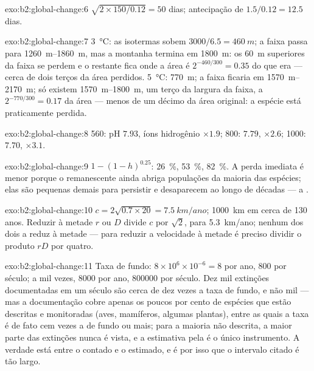 \begin{solution}{exo:b2:global-change:6}
$\sqrt{2\times 150/0.12} = 50$ dias; antecipação de $1.5/0.12 = 12.5$
dias.
\end{solution}

\begin{solution}{exo:b2:global-change:7}
\qty{3}{\celsius}: as isotermas sobem $3000/6.5 = \qty{460}{m}$; a
faixa passa para \qtyrange{1260}{1860}{m}, mas a montanha termina em
\qty{1800}{m}: os \qty{60}{m} superiores da faixa se perdem e o restante
fica onde a área é $2^{-460/300} = 0.35$ do que era --- cerca de
dois terços da área perdidos. \qty{5}{\celsius}: \qty{770}{m}; a
faixa ficaria em \qtyrange{1570}{2170}{m}; só existem \qtyrange{1570}{1800}{m},
um terço da largura da faixa, a $2^{-770/300} = 0.17$ da
área --- menos de um décimo da área original: a espécie está
praticamente perdida.
\end{solution}

\begin{solution}{exo:b2:global-change:8}
560: pH $7.93$, íons hidrogênio $\times 1.9$; 800: $7.79$, $\times
2.6$; 1000: $7.70$, $\times 3.1$.
\end{solution}

\begin{solution}{exo:b2:global-change:9}
$1 - (1 - h)^{0.25}$: \qty{26}{\%}, \qty{53}{\%}, \qty{82}{\%}. A
perda imediata é menor porque o remanescente ainda abriga populações da
maioria das espécies; elas são pequenas demais para persistir e
desaparecem ao longo de décadas --- a .
\end{solution}

\begin{solution}{exo:b2:global-change:10}
$c = 2\sqrt{0.7\times 20} = \qty{7.5}{km/ano}$; \qty{1000}{km} em
cerca de 130 anos. Reduzir à metade $r$ ou $D$ divide $c$ por
$\sqrt 2$, para \qty{5.3}{km/ano}; nenhum dos dois a reduz à metade ---
para reduzir a velocidade à metade é preciso dividir o produto $rD$ por quatro.
\end{solution}

\begin{solution}{exo:b2:global-change:11}
Taxa de fundo: $8\times 10^{6}\times 10^{-6} = 8$ por ano, 800 por
século; a mil vezes, 8000 por ano, \num{800000} por século. Dez mil
extinções documentadas em um século são cerca de dez vezes a taxa de
fundo, e não mil --- mas a documentação cobre apenas os poucos por cento
de espécies que estão descritas e monitoradas (aves, mamíferos, algumas
plantas), entre as quais a taxa é de fato cem vezes a de fundo ou mais;
para a maioria não descrita, a maior parte das extinções nunca é vista,
e a estimativa pela  é o único instrumento. A
verdade está entre o contado e o estimado, e é por isso que o intervalo
citado é tão largo.
\end{solution}

